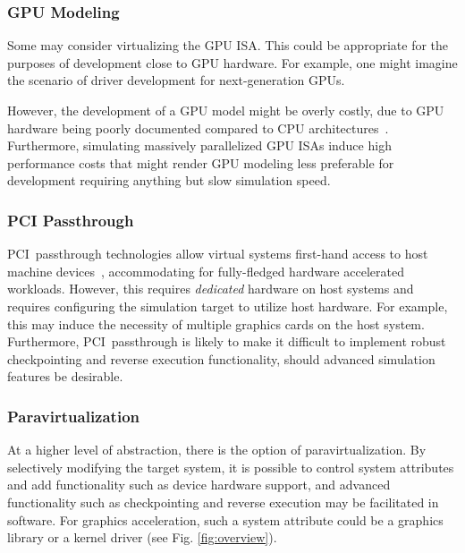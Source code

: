 \subsubsection{GPU Modeling}
\label{par:previousresearch_graphicsvirtualization_gpumodeling}
Some may consider virtualizing the GPU ISA.
This could be appropriate for the purposes of development close to GPU hardware.
For example, one might imagine the scenario of driver development for next-generation GPUs.

However, the development of a GPU model might be overly costly, due to GPU hardware being poorly documented compared to CPU architectures~.
Furthermore, simulating massively parallelized GPU ISAs induce high performance costs that might render GPU modeling less preferable for development requiring anything but slow simulation speed.

\subsubsection{PCI Passthrough}
\label{par:previousresearch_graphicsvirtualization_pcipassthrough}
PCI~passthrough technologies allow virtual systems first-hand access to host machine devices~, accommodating for fully-fledged hardware accelerated workloads.
However, this requires \textit{dedicated} hardware on host systems and requires configuring the simulation target to utilize host hardware.
For example, this may induce the necessity of multiple graphics cards on the host system.
Furthermore, PCI~passthrough is likely to make it difficult to implement robust checkpointing and reverse execution functionality, should advanced simulation features be desirable.

\subsubsection{Paravirtualization}
\label{par:previousresearch_graphicsvirtualization_paravirtualization}
At a higher level of abstraction, there is the option of paravirtualization.
By selectively modifying the target system, it is possible to control system attributes and add functionality such as device hardware support, and advanced functionality such as checkpointing and reverse execution may be facilitated in software.
For graphics acceleration, such a system attribute could be a graphics library or a kernel driver (see Fig. \ref{fig:overview}).

